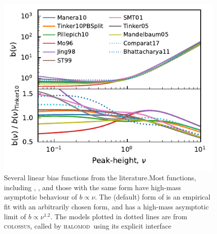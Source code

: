 \documentclass[5p,aas_macros]{elsarticle}
\newcommand{\halomod}{\textsc{halomod}\xspace} %
\begin{document}
\begin{figure}
  \centering
  \includegraphics[width=\linewidth]{bias_models.pdf}
  \caption[Several bias functions from the literature]{Several linear bias functions from the literature.Most functions, including \protect\citet{Mo1996}, \protect\citet{Sheth1999}, \protect\citet{Sheth2001} and those with the same form \protect\citep{Mandelbaum2005,Tinker2005} have high-mass asymptotic behaviour of $b \propto \nu$. The (default) form of \protect\citet{Tinker2010} is an empirical fit with an arbitrarily chosen form, and has a high-mass asymptotic limit of $b \propto  \nu^{1.2}$. The models plotted in dotted lines are from \textsc{colossus}, called by \halomod\ using its explicit interface}
  \label{fig:bias_functions}
\end{figure}
\end{document}
